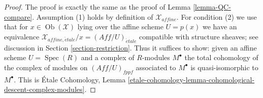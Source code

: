 \documentclass{stacks-project}
\theoremstyle{plain}
\theoremstyle{definition}
\theoremstyle{remark}
\numberwithin{equation}{subsection}
\def\Spec{\mathop{\mathrm{Spec}}}
\def\Ob{\mathop{\mathrm{Ob}}\nolimits}
\def\etale{{\acute{e}tale}}
\begin{document}
\begin{proof}
The proof is exactly the same as the proof of Lemma \ref{lemma-QC-compare}.
Assumption (1) holds by definition of $\mathcal{X}_{affine}$.
For condition (2) we use that for $x \in \Ob(\mathcal{X})$
lying over the affine scheme $U = p(x)$ we have an equivalence
$\mathcal{X}_{affine, \etale}/x = (\textit{Aff}/U)_\etale$ compatible
with structure sheaves; see
discussion in Section \ref{section-restriction}.
Thus it suffices to show: given an affine scheme $U = \Spec(R)$
and a complex of $R$-modules $M^\bullet$ the total cohomology
of the complex of modules on $(\textit{Aff}/U)_{fppf}$
associated to $M^\bullet$ is quasi-isomorphic to $M^\bullet$.
This is \'Etale Cohomology, Lemma
\ref{etale-cohomology-lemma-cohomological-descent-complex-modules}.
\end{proof}














\end{document}
